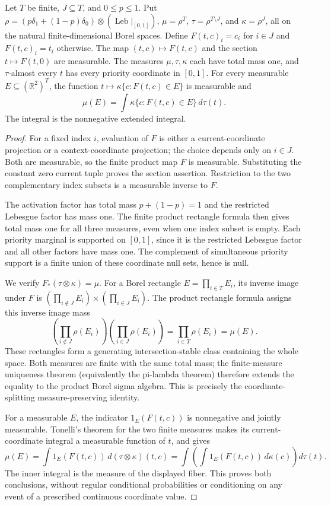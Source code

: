 \begin{lemma}
Let $T$ be finite, $J\subseteq T$, and $0\le p\le1$. Put
$\rho=(p\delta_1+(1-p)\delta_0)\otimes(\operatorname{Leb}|_{[0,1]})$,
$\mu=\rho^T$, $\tau=\rho^{T\setminus J}$, and $\kappa=\rho^J$,
all on the natural finite-dimensional Borel spaces. Define
$F(t,c)_i=c_i$ for $i\in J$ and $F(t,c)_i=t_i$ otherwise.
The map $(t,c)\mapsto F(t,c)$ and the section $t\mapsto F(t,0)$ are
measurable. The measures $\mu,\tau,\kappa$ each have total mass one,
and $\tau$-almost every $t$ has every priority coordinate in $[0,1]$.
For every measurable $E\subseteq(\mathbb R^2)^T$, the function
$t\mapsto\kappa\{c:F(t,c)\in E\}$ is measurable and
\[
 \mu(E)=\int \kappa\{c:F(t,c)\in E\}\,d\tau(t).
\]
The integral is the nonnegative extended integral.
\end{lemma}
\begin{proof}
For a fixed index $i$, evaluation of $F$ is either a current-coordinate
projection or a context-coordinate projection; the choice depends only on
$i\in J$. Both are measurable, so the finite product map $F$ is
measurable. Substituting the constant zero current tuple proves the section
assertion. Restriction to the two complementary index subsets is a
measurable inverse to $F$.

The activation factor has total mass $p+(1-p)=1$ and the restricted
Lebesgue factor has mass one. The finite product rectangle formula then
gives total mass one for all three measures, even when one index subset
is empty. Each priority marginal is supported on $[0,1]$, since it is the
restricted Lebesgue factor and all other factors have mass one. The
complement of simultaneous priority support is a finite union of these
coordinate null sets, hence is null.

We verify $F_*(\tau\otimes\kappa)=\mu$. For a Borel rectangle
$E=\prod_{i\in T}E_i$, its inverse image under $F$ is
$(\prod_{i\notin J}E_i)\times(\prod_{i\in J}E_i)$. The product
rectangle formula assigns this inverse image mass
\[
 \left(\prod_{i\notin J}\rho(E_i)\right)
 \left(\prod_{i\in J}\rho(E_i)\right)=\prod_{i\in T}\rho(E_i)=\mu(E).
\]
These rectangles form a generating intersection-stable class containing
the whole space. Both measures are finite with the same total mass; the
finite-measure uniqueness theorem (equivalently the pi-lambda theorem)
therefore extends the equality to the product Borel sigma algebra.
This is precisely the coordinate-splitting measure-preserving identity.

For a measurable $E$, the indicator $1_E(F(t,c))$ is nonnegative and
jointly measurable. Tonelli's theorem for the two finite measures makes
its current-coordinate integral a measurable function of $t$, and gives
\[
 \mu(E)=\int 1_E(F(t,c))\,d(\tau\otimes\kappa)(t,c)
       =\int\left(\int 1_E(F(t,c))\,d\kappa(c)\right)d\tau(t).
\]
The inner integral is the measure of the displayed fiber. This proves
both conclusions, without regular conditional probabilities or conditioning
on any event of a prescribed continuous coordinate value.
\end{proof}

